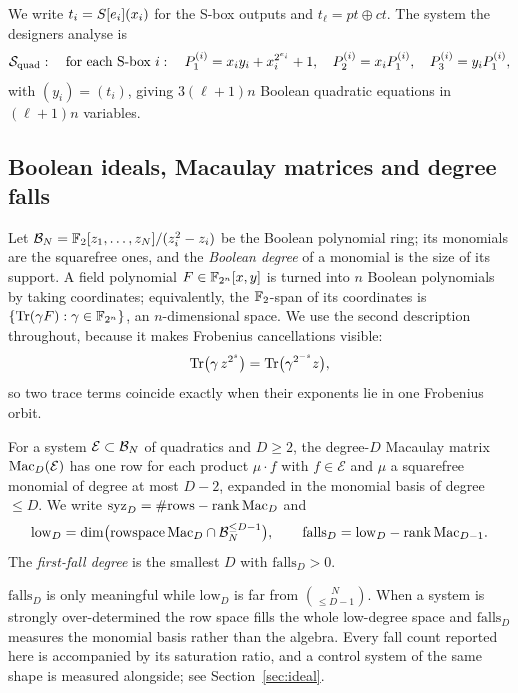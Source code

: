 We write $t_i=S[e_i](x_i)$ for the S-box outputs and $t_\ell=pt\oplus ct$. The system the
designers analyse is
\[
  \mathcal{S}_{\mathrm{quad}}:\quad \text{for each S-box } i:\quad
  P_1^{(i)}=x_iy_i+x_i^{2^{e_i}}+1,\quad P_2^{(i)}=x_iP_1^{(i)},\quad P_3^{(i)}=y_iP_1^{(i)} ,
\]
with $(y_i)=(t_i)$, giving $3(\ell+1)n$ Boolean quadratic equations in $(\ell+1)n$ variables.

\subsection{Boolean ideals, Macaulay matrices and degree falls}

Let $\mathcal{B}_N=\mathbb{F}_2[z_1,\dots,z_N]/(z_i^2-z_i)$ be the Boolean polynomial ring; its monomials are the
squarefree ones, and the \emph{Boolean degree} of a monomial is the size of its support. A field
polynomial $F\in\mathbb{F}_{2^n}[x,y]$ is turned into $n$ Boolean polynomials by taking coordinates; equivalently,
the $\mathbb{F}_2$-span of its coordinates is $\{\operatorname{Tr}(\gamma F):\gamma\in\mathbb{F}_{2^n}\}$, an $n$-dimensional space. We
use the second description throughout, because it makes Frobenius cancellations visible:
\begin{equation}\label{eq:trace-frobenius}
  \operatorname{Tr}\bigl(\gamma\, z^{2^s}\bigr)=\operatorname{Tr}\bigl(\gamma^{2^{-s}} z\bigr),
\end{equation}
so two trace terms coincide exactly when their exponents lie in one Frobenius orbit.

\begin{definition}\label{def:macaulay}
For a system $\mathcal E\subset\mathcal{B}_N$ of quadratics and $D\ge2$, the degree-$D$ Macaulay matrix
$\mathrm{Mac}_D(\mathcal E)$ has one row for each product $\mu\cdot f$ with $f\in\mathcal E$ and $\mu$ a
squarefree monomial of degree at most $D-2$, expanded in the monomial basis of degree $\le D$. We
write $\operatorname{syz}_D=\#\text{rows}-\operatorname{rank}\mathrm{Mac}_D$ and
\[
  \mathrm{low}_D=\dim\bigl(\operatorname{rowspace}\mathrm{Mac}_D\cap \mathcal{B}_N^{\le D-1}\bigr),\qquad
  \mathrm{falls}_D=\mathrm{low}_D-\operatorname{rank}\mathrm{Mac}_{D-1} .
\]
The \emph{first-fall degree} is the smallest $D$ with $\mathrm{falls}_D>0$.
\end{definition}

\begin{remark}[saturation]\label{rem:saturation}
$\mathrm{falls}_D$ is only meaningful while $\mathrm{low}_D$ is far from $\binom{N}{\le D-1}$. When a
system is strongly over-determined the row space fills the whole low-degree space and
$\mathrm{falls}_D$ measures the monomial basis rather than the algebra. Every fall count reported
here is accompanied by its saturation ratio, and a control system of the same shape is measured
alongside; see Section~\ref{sec:ideal}.
\end{remark}

